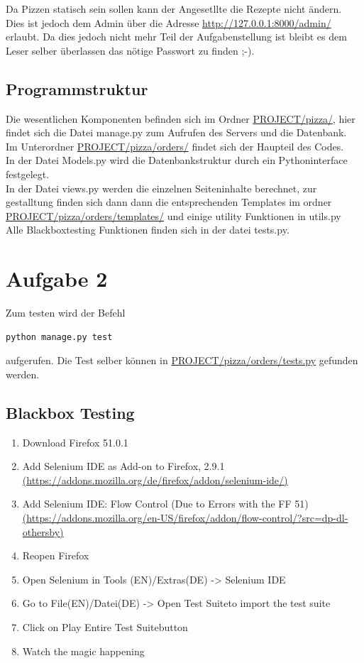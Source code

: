 \documentclass[a4paper]{report}
\begin{document}
Da Pizzen statisch sein sollen kann der Angesetllte die Rezepte nicht ändern. Dies ist jedoch dem Admin über die Adresse \url{http://127.0.0.1:8000/admin/} erlaubt. Da dies jedoch nicht mehr Teil der Aufgabenstellung ist bleibt es dem Leser selber überlassen das nötige Passwort zu finden ;-).


\subsection*{Programmstruktur}
Die wesentlichen Komponenten befinden sich im Ordner \url{PROJECT/pizza/}, hier findet sich die Datei manage.py zum Aufrufen des Servers und die Datenbank.\\
Im Unterordner  \url{PROJECT/pizza/orders/} findet sich der Haupteil des Codes.\\
In der Datei Models.py wird die Datenbankstruktur durch ein Pythoninterface festgelegt.\\
In der Datei views.py werden die einzelnen Seiteninhalte berechnet, zur gestalltung finden sich dann dann die entsprechenden Templates im ordner  \url{PROJECT/pizza/orders/templates/} und einige utility Funktionen in utils.py\\
Alle Blackboxtesting Funktionen finden sich in der datei tests.py.

\newpage
\section*{Aufgabe 2}
Zum testen wird der Befehl
\begin{lstlisting}
python manage.py test
\end{lstlisting}
aufgerufen. Die Test selber können in \url{PROJECT/pizza/orders/tests.py} gefunden werden.

\subsection*{Blackbox Testing}
\begin{enumerate}
\item Download Firefox 51.0.1
\item Add Selenium IDE as Add-on to Firefox, 2.9.1 \url{(https://addons.mozilla.org/de/firefox/addon/selenium-ide/)}
\item Add Selenium IDE: Flow Control (Due to Errors with the FF 51) \url{(https://addons.mozilla.org/en-US/firefox/addon/flow-control/?src=dp-dl-othersby)}
\item Reopen Firefox
\item Open Selenium in Tools (EN)/Extras(DE) -> Selenium IDE
\item Go to File(EN)/Datei(DE) -> \glqq Open Test Suite\grqq to import the test suite
\item Click on \glqq Play Entire Test Suite\grqq button
\item Watch the magic happening
\end{enumerate}
\end{document}
